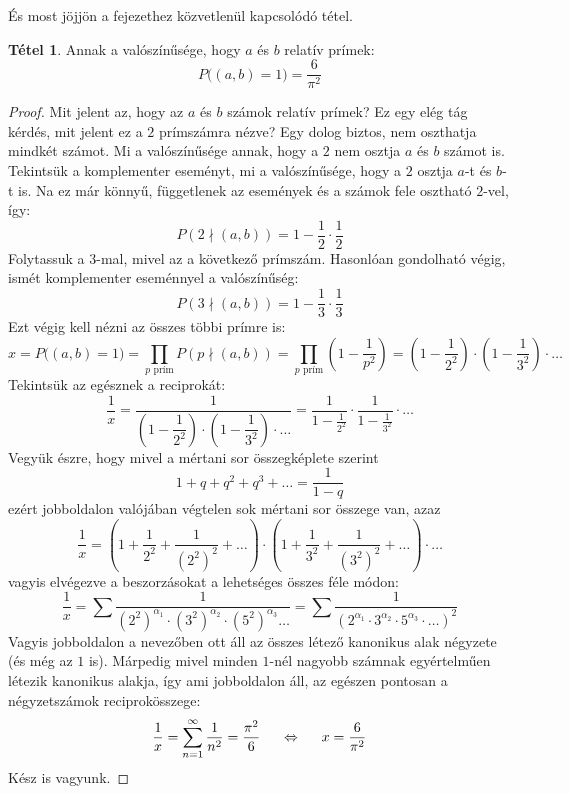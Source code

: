 \documentclass[12pt]{book}
\theoremstyle{plain} %
\theoremstyle{definition} %
\newtheorem{theo/}{Tétel}[section]
\newenvironment{theo}
  {\renewcommand{\qedsymbol}{$\clubsuit$}%
   \pushQED{\qed}\begin{theo/}}
  {\popQED\end{theo/}}
\theoremstyle{remark}
\renewcommand\qedsymbol{$\blacksquare$}
\numberwithin{equation}{section}  %
\begin{document}
	És most jöjjön a fejezethez közvetlenül kapcsolódó tétel.
	
	\begin{theo}
		Annak a valószínűsége, hogy $a$ és $b$ relatív prímek:
		\[ P\Big( (a,b) = 1 \Big) = \dfrac{6}{\pi^2}  \]
	\end{theo}

	\begin{proof}
		Mit jelent az, hogy az $a$ és $b$ számok relatív prímek? Ez egy elég tág kérdés, mit jelent ez a $2$ prímszámra nézve? Egy dolog biztos, nem oszthatja mindkét számot. Mi a valószínűsége annak, hogy a $2$ nem osztja $a$ és $b$ számot is. Tekintsük a komplementer eseményt, mi a valószínűsége, hogy a $2$ osztja $a$-t és $b$-t is. Na ez már könnyű, függetlenek az események és a számok fele osztható $2$-vel, így:
		\[ P\left( 2\nmid (a,b)\right) = 1 - \dfrac{1}{2} \cdot \dfrac{1}{2}  \]
		Folytassuk a $3$-mal, mivel az a következő prímszám. Hasonlóan gondolható végig, ismét komplementer eseménnyel a valószínűség:
		\[ P\left(3\nmid (a,b)\right) = 1 - \dfrac{1}{3} \cdot \dfrac{1}{3} \]
		Ezt végig kell nézni az összes többi prímre is:
		\[ x = P\Big( (a,b) = 1   \Big) = \prod_{p \text{ prím}} P\left( p\nmid (a,b) \right) = \prod_{p \text{ prím}} \left( 1- \dfrac{1}{p^2}   \right) = \left( 1 - \dfrac{1}{2^2}  \right) \cdot \left( 1 - \dfrac{1}{3^2}  \right) \cdot \ldots  \]
		Tekintsük az egésznek a reciprokát:
		\[ \dfrac{1}{x} = \dfrac{1}{\left( 1 - \dfrac{1}{2^2}  \right) \cdot \left( 1 - \dfrac{1}{3^2}  \right) \cdot \ldots} = \dfrac{1}{1-\frac{1}{2^2}} \cdot \dfrac{1}{1-\frac{1}{3^2}} \cdot \ldots  \]
		Vegyük észre, hogy mivel a mértani sor összegképlete szerint
		\[ 1+q+q^2+q^3+\ldots = \dfrac{1}{1-q}  \]
		ezért jobboldalon valójában végtelen sok mértani sor összege van, azaz
		\[ \dfrac{1}{x} = \left(1+\dfrac{1}{2^2} + \dfrac{1}{(2^2)^2} + \ldots \right)\cdot \left(1+\dfrac{1}{3^2}+\dfrac{1}{(3^2)^2}+\ldots\right)\cdot \ldots  \]
		vagyis elvégezve a beszorzásokat a lehetséges összes féle módon:
		\[ \dfrac{1}{x} = \sum \dfrac{1}{(2^2)^ {\alpha_1}\cdot (3^2)^{\alpha_2} \cdot (5^2)^{\alpha_3} \ldots } = \sum \dfrac{1}{(2^{\alpha_1}\cdot 3^{\alpha_2}\cdot 5^{\alpha_3} \cdot \ldots)^2}  \]
		Vagyis jobboldalon a nevezőben ott áll az összes létező kanonikus alak négyzete (és még az $1$ is). Márpedig mivel minden $1$-nél nagyobb számnak egyértelműen létezik kanonikus alakja, így ami jobboldalon áll, az egészen pontosan a négyzetszámok reciprokösszege:
		\[ \dfrac{1}{x} = \sum\limits_{n=1}^{\infty} \dfrac{1}{n^2} = \dfrac{\pi^2}{6} \hspace{5mm} \Leftrightarrow \hspace{5mm} x = \dfrac{6}{\pi^2}  \]
		Kész is vagyunk.
	\end{proof}
	
\end{document}
